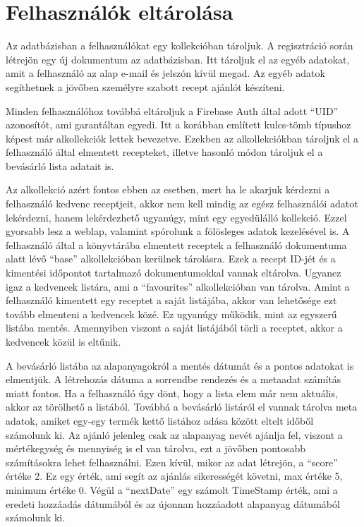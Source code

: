 \documentclass[12pt]{report}
\theoremstyle{definition}
\begin{document}
\section{Felhasználók eltárolása}
\label{dataSchemes:users}
Az adatbázisban a felhasználókat egy kollekcióban tároljuk. A regisztráció során létrejön egy új dokumentum az adatbázisban. Itt tároljuk el az egyéb adatokat, amit a felhasználó az alap e-mail és jelszón kívül megad. Az egyéb adatok segíthetnek a jövőben személyre szabott recept ajánlót készíteni. 

Minden felhasználóhoz továbbá eltároljuk a Firebase Auth által adott “UID” azonosítót, ami garantáltan egyedi. Itt a korábban említett kulcs-tömb típushoz képest már alkollekciók lettek bevezetve. Ezekben az alkollekciókban tároljuk el a felhasználó által elmentett recepteket, illetve hasonló módon tároljuk el a bevásárló lista adatait is.

Az alkollekció azért fontos ebben az esetben, mert ha le akarjuk kérdezni a felhasználó kedvenc receptjeit, akkor nem kell mindig az egész felhasználói adatot lekérdezni, hanem lekérdezhető ugyanúgy, mint egy egyedülálló kollekció. Ezzel gyorsabb lesz a weblap, valamint spórolunk a fölösleges adatok kezelésével is. A felhasználó által a könyvtárába elmentett receptek a felhasználó dokumentuma alatt lévő “base” alkollekcióban kerülnek tárolásra. Ezek a recept ID-jét és a kimentési időpontot tartalmazó dokumentumokkal vannak eltárolva. Ugyanez igaz a kedvencek listára, ami a  “favourites” alkollekcióban van tárolva. Amint a felhasználó kimentett egy receptet a saját listájába, akkor van lehetősége ezt tovább elmenteni a kedvencek közé. Ez ugyanúgy működik, mint az egyszerű listába mentés. Amennyiben viszont a saját listájából törli a receptet, akkor a kedvencek közül is eltűnik. 

A bevásárló listába az alapanyagokról a mentés dátumát és a pontos adatokat is elmentjük. A létrehozás dátuma a sorrendbe rendezés és a metaadat számítás miatt fontos. Ha a felhasználó úgy dönt, hogy a lista elem már nem aktuális, akkor az törölhető a listából. Továbbá a bevásárló listáról el vannak tárolva meta adatok, amiket egy-egy termék kettő listához adása között eltelt időből számolunk ki. Az ajánló jelenleg csak az alapanyag nevét ajánlja fel, viszont a mértékegység és mennyiség is el van tárolva, ezt a jövőben pontosabb számításokra lehet felhasználni. Ezen kívül, mikor az adat létrejön, a “score” értéke 2. Ez egy érték, ami segít az ajánlás sikerességét követni, max értéke 5, minimum értéke 0. Végül a “nextDate” egy számolt TimeStamp érték, ami a eredeti hozzáadás dátumából és az újonnan hozzáadott alapanyag dátumából számolunk ki.
\end{document}
